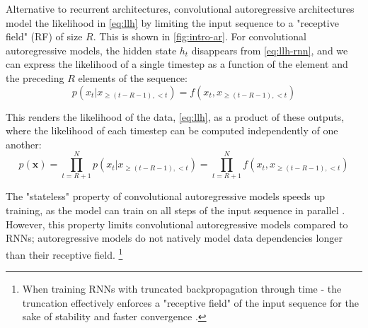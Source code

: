 


Alternative to recurrent architectures, convolutional autoregressive architectures model the likelihood in \cref{eq:llh} by limiting the input sequence to a "receptive field" (RF) of size $R$.
This is shown in \cref{fig:intro-ar}.
For convolutional autoregressive models, the hidden state $h_t$ disappears from \cref{eq:llh-rnn}, and we can express the likelihood of a single timestep as a function of the element and the preceding $R$ elements of the sequence: 
\begin{equation}
    p(x_t | x_{\geq(t-R-1), <t}) = f(x_t, x_{\geq(t-R-1), <t})
\end{equation}\label{eq:llh-ar-rf}

This renders the likelihood of the data, \cref{eq:llh}, as a product of these outputs, where the likelihood of each timestep can be computed independently of one another:
\begin{equation}
    p(\mathbf{x}) = \prod^N_{t=R+1}  p(x_t | x_{\geq(t-R-1), <t}) = \prod^N_{t=R+1} f(x_t, x_{\geq(t-R-1), <t})
\end{equation}\label{eq:llh-ar-rf-long}


The "stateless" property of convolutional autoregressive models speeds up training, as the model can train on all steps of the input sequence in parallel \cite{salimans_pixelcnn_2017}.
However, this property limits convolutional autoregressive models compared to RNNs; autoregressive models do not natively model data dependencies longer than their receptive field.
\footnote{
When training RNNs with truncated backpropagation through time - the truncation effectively enforces a "receptive field" of the input sequence for the sake of stability and faster convergence
\cite{miller_stable_2019, cuellar_application_2006}.
}


